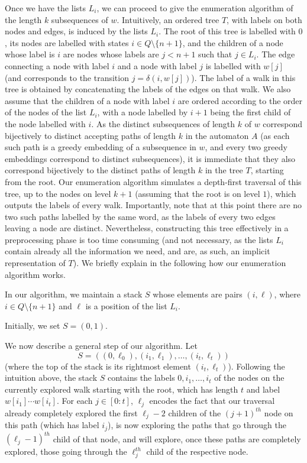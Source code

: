 \documentclass[10pt,a4paper]{amsart}
\makeatletter
\theoremstyle{plain}
\theoremstyle{definition}
\renewenvironment{proof}[1][\proofname]{\par
  \pushQED{}%
  \normalfont \topsep6\p@\@plus6\p@\relax
  \trivlist
  \item[\hskip\labelsep\itshape #1\@addpunct{.}]\ignorespaces
}{%
  \popQED\endtrivlist\@endpefalse
}
\makeatother
\begin{document}
\begin{proof}
Once we have the lists $L_i$, we can proceed to give the enumeration algorithm of the length $k$ subsequences of $w$. Intuitively, an ordered tree $T$, with labels on both nodes and edges, is induced by the lists $L_i$. The root of this tree is labelled with $0$, its nodes are labelled with states $i\in Q\setminus \{n+1\}$, and the children of a node whose label is $i$ are nodes whose labels are $j< n+1$ such that $j\in L_i$. The edge connecting a node with label $i$ and a node with label $j$ is labelled with $w[j]$ (and corresponds to the transition $j=\delta(i,w[j])$). The label of a walk in this tree is obtained by concatenating the labels of the edges on that walk. We also assume that the children of a node with label $i$ are ordered according to the order of the nodes of the list $L_i$, with a node labelled by $i+1$ being the first child of the node labelled with $i$. As the distinct subsequences of length $k$ of $w$ correspond bijectively to distinct accepting paths of length $k$ in the automaton $A$ (as each such path is a greedy embedding of a subsequence in $w$, and every two greedy embeddings correspond to distinct subsequences), it is immediate that they also correspond bijectively to the distinct paths of length $k$ in the tree $T$, starting from the root. Our enumeration algorithm simulates a depth-first traversal of this tree, up to the nodes on level $k+1$ (assuming that the root is on level $1$), which outputs the labels of every walk. Importantly, note that at this point there are no two such paths labelled by the same word, as the labels of every two edges leaving a node are distinct. Nevertheless, constructing this tree effectively in a preprocessing phase is too time consuming (and not necessary, as the lists $L_i$ contain already all the information we need, and are, as such, an implicit representation of $T$). We briefly explain in the following how our enumeration algorithm works. 

In our algorithm, we maintain a stack $S$ whose elements are pairs $(i,\ell)$, where $i\in Q\setminus \{n+1\}$ and $\ell$ is a position of the list $L_i$.

Initially, we set $S=(0,1)$. 

We now describe a general step of our algorithm. Let 
\[
S=((0,\ell_0), (i_1, \ell_1), \ldots, (i_t, \ell_t))
\]
(where the top of the stack is its rightmost element $(i_t, \ell_t)$). Following the intuition above, the stack $S$ contains the labels $0,i_1,\ldots,i_t$ of the nodes on the currently explored walk starting with the root, which has length $t$ and label $w[i_1]\cdots w[i_t]$. For each $j\in [0:t]$, $\ell_j$ encodes the fact that our traversal already completely explored the first $\ell_j-2$ children of the $(j+1)^{th}$ node on this path (which has label $i_j$), is now exploring the paths that go through the $(\ell_j-1)^{th}$ child of that node, and will explore, once these paths are completely explored, those going through the $\ell_j^{th}$ child of the respective node. 


\end{proof}
\end{document}
